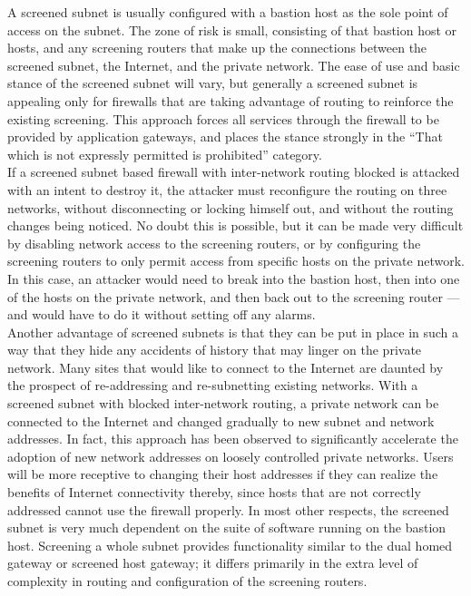 \begin{htmllist}
    \label{scr_sub}
    
    A screened subnet is usually configured with a bastion host as the sole
    point of access on the subnet. The zone of risk is small, consisting of
    that bastion host or hosts, and any screening routers that make up the
    connections between the screened subnet, the Internet, and the private
    network. The ease of use and basic stance of the screened subnet will
    vary, but generally a screened subnet is appealing only for firewalls
    that are taking advantage of routing to reinforce the existing
    screening. This approach forces all services through the firewall to be
    provided by application gateways, and places the stance strongly in the
    ``That which is not expressly permitted is prohibited'' category.\\
    
    If a screened subnet based firewall with inter-network routing blocked
    is attacked with an intent to destroy it, the attacker must reconfigure
    the routing on three networks, without disconnecting or locking himself
    out, and without the routing changes being noticed. No doubt this is
    possible, but it can be made very difficult by disabling network access
    to the screening routers, or by configuring the screening routers to
    only permit access from specific hosts on the private network. In this
    case, an attacker would need to break into the bastion host, then into
    one of the hosts on the private network, and then back out to the
    screening router --- and would have to do it without setting off any
    alarms.\\
    
    Another advantage of screened subnets is that they can be put in place
    in such a way that they hide any accidents of history that may linger
    on the private network. Many sites that would like to connect to the
    Internet are daunted by the prospect of re-addressing and re-subnetting
    existing networks. With a screened subnet with blocked inter-network
    routing, a private network can be connected to the Internet and changed
    gradually to new subnet and network addresses. In fact, this approach
    has been observed to significantly accelerate the adoption of new
    network addresses on loosely controlled private networks. Users will be
    more receptive to changing their host addresses if they can realize the
    benefits of Internet connectivity thereby, since hosts that are not
    correctly addressed cannot use the firewall properly. In most other
    respects, the screened subnet is very much dependent on the suite of
    software running on the bastion host. Screening a whole subnet provides
    functionality similar to the dual homed gateway or screened host
    gateway; it differs primarily in the extra level of complexity in
    routing and configuration of the screening routers.



\end{htmllist}
